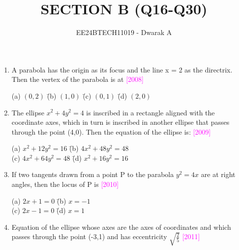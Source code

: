 \documentclass[journal,12pt,twocolumn]{IEEEtran}
\theoremstyle{remark}
\begin{document}

\vspace{3cm}

\title{SECTION B (Q16-Q30)}
\author{EE24BTECH11019 - Dwarak A}
\maketitle
\newpage
\bigskip

\renewcommand{\thefigure}{\theenumi}
\renewcommand{\thetable}{\theenumi}

\begin{enumerate}[label=\textcolor{magenta}{\arabic*.}]
    \item A parabola has the origin as its focus and the line x = 2 as the directrix. Then the vertex of the parabola is at
    \hfill{\textcolor{magenta}{[2008]}}

    \begin{tabbing}
        (a) $(0,2)$ \hspace{.8em} \= (b) $(1,0)$ \hspace{.8em} \= (c) $(0,1)$ \hspace{.8em} \= (d) $(2,0)$ \\
    \end{tabbing}
    \item The ellipse $x^2+4y^2=4$ is inscribed in a rectangle aligned with the coordinate axes, which in turn is inscribed in another ellipse that passes through the point (4,0). Then the equation of the ellipse is:
    \hfill{\textcolor{magenta}{[2009]}}

    \begin{tabbing}
        (a) $x^2+12y^2=16$ \hspace{1.2em} \= (b) $4x^2+48y^2=48$ \\
        (c) $4x^2+64y^2=48$ \hspace{0.7em} \= (d) $x^2+16y^2=16$ \\
    \end{tabbing}
    \item If two tangents drawn from a point P to the parabola $y^2=4x$ are at right angles, then the locus of P is
    \hfill{\textcolor{magenta}{[2010]}}
    
    \begin{tabbing}
        (a) $2x+1=0$ \hspace{3.2em} \= (b) $x=-1$ \\
        (c) $2x-1=0$ \hspace{3.2em} \= (d) $x=1$ \\
    \end{tabbing}
    \item Equation of the ellipse whose axes are the axes of coordinates and which passes through
    the point (-3,1) and has eccentricity $\sqrt{\frac{2}{5}}$
    \hfill{\textcolor{magenta}{[2011]}}
    

\end{enumerate}
\end{document}
